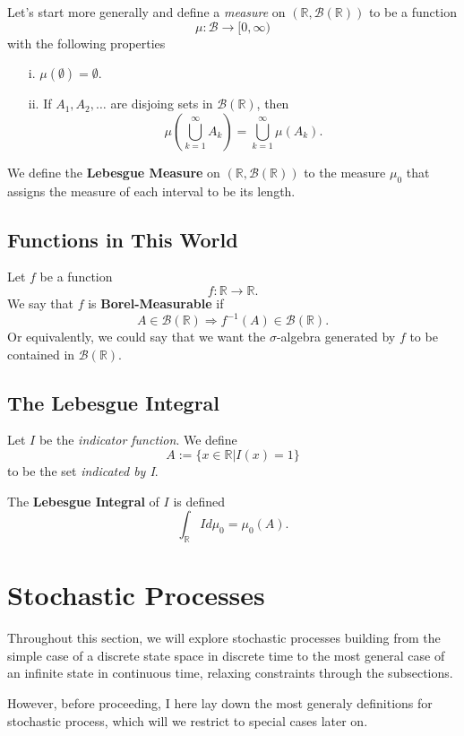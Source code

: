 \documentclass[12pt]{article}
\theoremstyle{plain}
\theoremstyle{definition}
\theoremstyle{remark}
\begin{document}
Let's start more generally and define a \emph{measure} on $(\mathbb{R},\mathcal{B}(\mathbb{R}))$ to be a function
\[ \mu: \mathcal{B} \rightarrow [0,\infty) \]
with the following properties
\begin{itemize}
   \item[i.]{$\mu(\emptyset) = \emptyset$.}
   \item[ii.]{If $A_1, A_2, \ldots$ are disjoing sets in $\mathcal{B}(\mathbb{R})$, then
	 \[ \mu\left(\bigcup_{k=1}^{\infty} A_k\right) =  \bigcup_{k=1}^{\infty} \mu(A_k). \]
      }
\end{itemize}

We define the \textbf{Lebesgue Measure} on $(\mathbb{R}, \mathcal{B}(\mathbb{R}))$ to the measure $\mu_0$ that assigns the measure of
each interval to be its length.

\subsection{Functions in This World}

Let $f$ be a function
\[ f: \mathbb{R} \rightarrow \mathbb{R}. \]
We say that $f$ is \textbf{Borel-Measurable} if
\[ A \in \mathcal{B}(\mathbb{R}) \Rightarrow f^{-1}(A) \in \mathcal{B}(\mathbb{R}). \]
Or equivalently, we could say that we want the $\sigma$-algebra generated by $f$ to be contained in $\mathcal{B}(\mathbb{R})$.

\subsection{The Lebesgue Integral}

Let $I$ be the \emph{indicator function}.  We define
\[ A := \{ x \in \mathbb{R}| I(x) =1 \} \]
to be the set \emph{indicated by I}.

The \textbf{Lebesgue Integral} of $I$ is defined
\[ \int_{\mathbb{R}} I d\mu_0 = \mu_0(A). \]


\section{Stochastic Processes}

Throughout this section, we will explore stochastic processes building
from the simple case of a discrete state space in discrete time to the
most general case of an infinite state in continuous time, relaxing constraints through the subsections.

However, before proceeding, I here lay down the most generaly
definitions for stochastic process, which will we restrict to special
cases later on.
\end{document}
